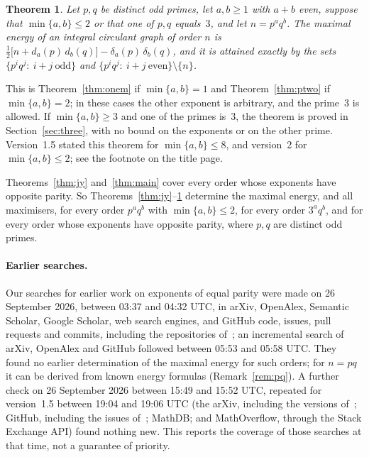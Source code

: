 \documentclass[11pt]{article}
\newtheorem{theorem}{Theorem}
\theoremstyle{remark}
\begin{document}
\begin{theorem}\label{thm:minfour}
Let $p,q$ be distinct odd primes, let $a,b\ge1$ with $a+b$ even, suppose that
$\min\{a,b\}\le2$ or that one of $p,q$ equals~$3$, and let $n=p^aq^b$. The
maximal energy of an integral circulant graph of order $n$ is
$\tfrac12\bigl[n+d_a(p)\,d_b(q)\bigr]-\delta_a(p)\,\delta_b(q)$, and it is
attained exactly by the sets $\{p^iq^j:\ i+j\ \text{odd}\}$ and
$\{p^iq^j:\ i+j\ \text{even}\}\setminus\{n\}$.
\end{theorem}

This is Theorem~\ref{thm:onem} if $\min\{a,b\}=1$ and Theorem~\ref{thm:ptwo} if
$\min\{a,b\}=2$; in these cases the other exponent is arbitrary, and the prime~$3$
is allowed. If $\min\{a,b\}\ge3$ and one of the primes is~$3$, the theorem is
proved in Section~\ref{sec:three}, with no bound on the exponents or on the other
prime. Version~1.5 stated this theorem for $\min\{a,b\}\le8$, and version~2 for
$\min\{a,b\}\le2$; see the footnote on the title page.

Theorems~\ref{thm:jy} and~\ref{thm:main} cover every order whose exponents
have opposite parity. So Theorems~\ref{thm:jy}--\ref{thm:minfour} determine
the maximal energy, and all maximisers, for every order $p^aq^b$ with
$\min\{a,b\}\le2$, for every order $3^aq^b$, and for every order whose exponents
have opposite parity, where $p,q$ are distinct odd primes.

\paragraph{Earlier searches.} Our searches for earlier work on exponents of
equal parity were made on 26 September 2026, between 03:37 and 04:32 UTC, in
arXiv, OpenAlex, Semantic Scholar, Google Scholar, web search engines, and
GitHub code, issues, pull requests and commits, including the repositories
of~\cite{park,schreib,tru}; an incremental search of arXiv, OpenAlex and GitHub
followed between 05:53 and 05:58 UTC. They found no earlier determination of the
maximal energy for such orders; for $n=pq$ it can be derived from known energy
formulas (Remark~\ref{rem:pq}). A further check on 26 September 2026 between
15:49 and 15:52 UTC, repeated for version~1.5 between 19:04 and 19:06 UTC (the
arXiv, including the versions of~\cite{jy}; GitHub, including the issues
of~\cite{tru}; MathDB; and MathOverflow, through the Stack Exchange API) found
nothing new. This reports the coverage of those searches at that time, not a
guarantee of priority.
\end{document}
